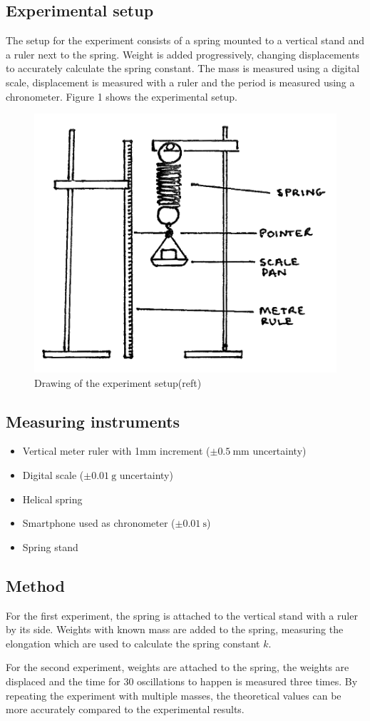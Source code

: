 \documentclass[a4paper, 10pt]{article}
\begin{document}
\begin{flushleft}
\subsection{Experimental setup}
The setup for the experiment consists of a spring mounted to a vertical stand
and a ruler next to the spring. Weight is added progressively, changing
displacements to accurately calculate the spring constant. The mass is measured
using a digital scale, displacement is measured with a ruler and the period is
measured using a chronometer. Figure 1 shows the experimental setup.
\begin{figure}[!h]
    \centering
    \includegraphics[width = 0.5\linewidth]{13.png}
    \caption{Drawing of the experiment setup(reft)}
\end{figure}
\newpage
\subsection{Measuring instruments}
\begin{itemize}
    \item Vertical meter ruler with 1mm increment ($\pm 0.5~\mathrm{mm}$ uncertainty)
    \item Digital scale ($\pm 0.01~\mathrm{g}$ uncertainty)
    \item Helical spring
    \item Smartphone used as chronometer ($\pm  0.01~\mathrm{s} $)
    \item Spring stand
\end{itemize}
\subsection{Method}
For the first experiment, the spring is attached to the vertical stand with a ruler by its side. Weights
with known mass are added to the spring, measuring the elongation which are used
to calculate the spring constant $k$.
\par
For the second experiment, weights are attached to the spring, the weights
are displaced and the time for 30 oscillations to happen is measured three
times. By repeating the experiment with multiple masses, the theoretical values
can be more accurately compared to the experimental results.

\end{flushleft}
\end{document}
